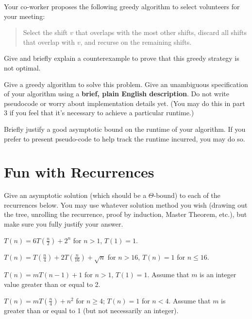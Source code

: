 \documentclass[11pt,fleqn]{exam}
\newif\ifsolutions\solutionsfalse
\begin{document}
\begin{questions}
\question[2] Your co-worker proposes the following greedy algorithm to select volunteers for your meeting:
\begin{quote}
    Select the shift $v$ that overlaps with the most other shifts, discard all shifts that overlap with $v$, and recurse on the remaining shifts.
\end{quote}
Give and briefly explain a counterexample to prove that this greedy strategy is not optimal.

\ifsolutions\fi 

\question[3] Give a greedy algorithm to solve this problem. Give an unambiguous specification of your algorithm using  a \textbf{brief, plain English description}. Do not write pseudocode or worry about implementation details yet. (You may do this in part 3 if you feel that it's necessary to achieve a particular runtime.)

\ifsolutions\fi 

\question[4] Briefly justify a good asymptotic bound on the runtime of your algorithm. If you prefer to present pseudo-code to help track the runtime incurred, you may do so.

\ifsolutions\fi 

\end{questions}

\clearpage
\section{Fun with Recurrences}

Give an asymptotic solution (which should be a $\Theta$-bound) to each of the recurrences below. You may use whatever solution method you wish (drawing out the tree, unrolling the recurrence, proof by induction, Master Theorem, etc.), but make sure you fully justify your answer.
	
\begin{questions}

    \question[3] $T(n) = 6T\left( \frac{n}{2} \right) + 2^n$ for $n > 1$, $T(1) = 1$.

    \ifsolutions\fi 

    \question[3] $T(n) = T\left( \frac{n}{4} \right) + 2T\left( \frac{n}{16} \right) + \sqrt{n}$ for $n > 16$, $T(n) = 1$ for $n \le 16$.

    \ifsolutions\fi 

    \question[4] $T(n) = mT(n-1) + 1$ for $n > 1$, $T(1) = 1$. Assume that $m$ is an integer value greater than or equal to 2.

    \ifsolutions\fi 

    \question[4] $T(n) = mT(\frac{n}{4}) + n^2$ for $n \ge 4$; $T(n) = 1$ for $n < 4$. Assume that $m$ is greater than or equal to 1 (but not necessarily an integer).

    \ifsolutions\fi 

\end{questions}
\end{document}
